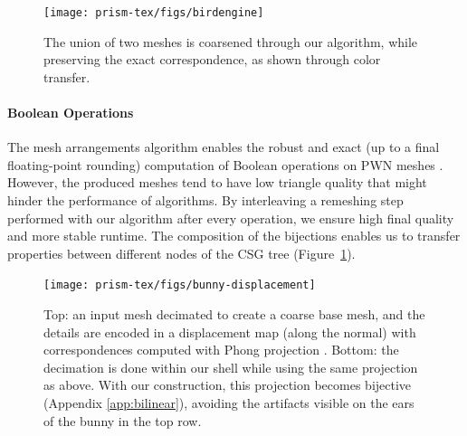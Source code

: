 

\begin{figure}
    \centering
    \texttt{[image: prism-tex/figs/birdengine]}
    \caption{The union of two meshes is coarsened through our algorithm, while preserving the exact correspondence, as shown through color transfer.}
    \label{prism:fig:birdengine}
    
\end{figure}

\paragraph{Boolean Operations}
The mesh arrangements algorithm enables the robust and exact (up to a final floating-point rounding) computation of Boolean operations on PWN meshes \cite{zhou2016mesh}. 
However, the produced meshes tend to have low triangle quality that might hinder the performance of  algorithms. %
By interleaving a remeshing step performed with our algorithm after every operation, we ensure  high final quality and more stable runtime. The composition of the bijections enables us to transfer properties between different nodes of the CSG tree (Figure~\ref{prism:fig:birdengine}).%


\begin{figure}
    \centering
    \texttt{[image: prism-tex/figs/bunny-displacement]}
    \caption{Top: an input mesh decimated to create a coarse base mesh, and the details are encoded in a displacement map (along the normal) with correspondences computed with Phong projection \cite{kobbelt1998interactive}. Bottom: the decimation is done within our shell while using the same projection as above. With our construction, this projection becomes bijective (Appendix \ref{app:bilinear}), avoiding the artifacts visible on the ears of  the bunny in the top row.}
    \label{prism:fig:displacement-mapping}
    
\end{figure}
